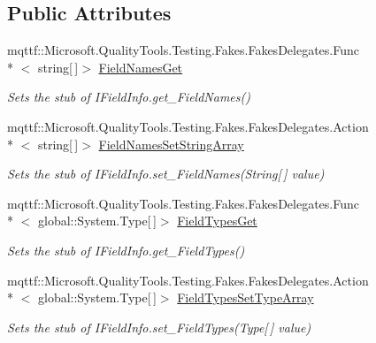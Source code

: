 \subsection*{Public Attributes}
\begin{DoxyCompactItemize}
\item 
mqttf\-::\-Microsoft.\-Quality\-Tools.\-Testing.\-Fakes.\-Fakes\-Delegates.\-Func\\*
$<$ string\mbox{[}$\,$\mbox{]}$>$ \hyperlink{class_system_1_1_runtime_1_1_serialization_1_1_formatters_1_1_fakes_1_1_stub_i_field_info_af5efdd2303e7d31538c68d4db2c95ee5}{Field\-Names\-Get}
\begin{DoxyCompactList}\small\item\em Sets the stub of I\-Field\-Info.\-get\-\_\-\-Field\-Names()\end{DoxyCompactList}\item 
mqttf\-::\-Microsoft.\-Quality\-Tools.\-Testing.\-Fakes.\-Fakes\-Delegates.\-Action\\*
$<$ string\mbox{[}$\,$\mbox{]}$>$ \hyperlink{class_system_1_1_runtime_1_1_serialization_1_1_formatters_1_1_fakes_1_1_stub_i_field_info_a5ec1cb1b7fed25bf551b6666a6c14382}{Field\-Names\-Set\-String\-Array}
\begin{DoxyCompactList}\small\item\em Sets the stub of I\-Field\-Info.\-set\-\_\-\-Field\-Names(\-String\mbox{[}$\,$\mbox{]} value)\end{DoxyCompactList}\item 
mqttf\-::\-Microsoft.\-Quality\-Tools.\-Testing.\-Fakes.\-Fakes\-Delegates.\-Func\\*
$<$ global\-::\-System.\-Type\mbox{[}$\,$\mbox{]}$>$ \hyperlink{class_system_1_1_runtime_1_1_serialization_1_1_formatters_1_1_fakes_1_1_stub_i_field_info_a9dafda811de018bdf1eb1ae0d7ff5893}{Field\-Types\-Get}
\begin{DoxyCompactList}\small\item\em Sets the stub of I\-Field\-Info.\-get\-\_\-\-Field\-Types()\end{DoxyCompactList}\item 
mqttf\-::\-Microsoft.\-Quality\-Tools.\-Testing.\-Fakes.\-Fakes\-Delegates.\-Action\\*
$<$ global\-::\-System.\-Type\mbox{[}$\,$\mbox{]}$>$ \hyperlink{class_system_1_1_runtime_1_1_serialization_1_1_formatters_1_1_fakes_1_1_stub_i_field_info_a0fdbe46757c4f0c242f6c6c2aa5423a9}{Field\-Types\-Set\-Type\-Array}
\begin{DoxyCompactList}\small\item\em Sets the stub of I\-Field\-Info.\-set\-\_\-\-Field\-Types(\-Type\mbox{[}$\,$\mbox{]} value)\end{DoxyCompactList}\end{DoxyCompactItemize}


